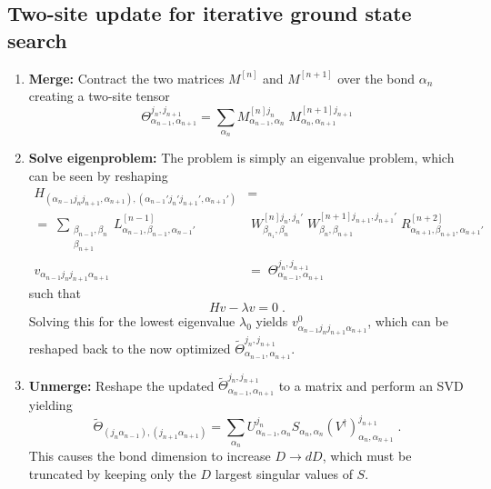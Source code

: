 \subsection{Two-site update for iterative ground state search}
\begin{enumerate}
\item
\textbf{Merge:} Contract the two matrices $M^{[n]}$ and $M^{[n+1]}$ over the bond $\alpha_{n}$ creating a two-site tensor
\begin{equation}
\Theta_{\alpha_{n-1} , \alpha_{n+1}}^{j_n , j_{n+1}} = \sum_{\alpha_n} M_{\alpha_{n-1} , \alpha_{n}}^{[n] j_n } \;  M_{\alpha_{n} , \alpha_{n+1}}^{[n+1] j_{n+1} } 
\end{equation}

\item
\textbf{Solve eigenproblem:} The problem is simply an eigenvalue problem, which can be seen by reshaping
\begin{align}
	H_{( \alpha_{n-1}  j_n  j_{n+1}, \alpha_{n+1}),(\alpha_{n-1}'  j_n '  j_{n+1}', \alpha_{n+1}')} &= \nonumber \\
	= \; \sum_{\substack{\beta_{n-1} , \beta_n \\ \beta_{n+1}}} L_{\alpha_{n-1}, \beta_{n-1} , \alpha_{n-1} '}^{[n-1]} & \; W_{\beta_{n_1}, \beta_n}^{[n] j_n , j_n '} \; W_{\beta_{n}, \beta_{n+1}}^{[n+1] j_{n+1} , j_{n+1} '}\;  R_{\alpha_{n+1} ,\beta_{n+1} , \alpha_{n+1} '}^{[n+2]} \\
	v_{ \alpha_{n-1} j_n j_{n+1} \alpha_{n+1}} &= \; \Theta_{\alpha_{n-1} , \alpha_{n+1}}^{j_n , j_{n+1}}
\end{align}
such that
\begin{equation}
	H v - \lambda v = 0 \; .
	\label{eq:eigprob}
\end{equation}
Solving this for the lowest eigenvalue $\lambda_0$ yields $v_{ \alpha_{n-1} j_n j_{n+1} \alpha_{n+1}}^0$, which can be reshaped back to the now optimized $\tilde{\Theta}_{\alpha_{n-1} , \alpha_{n+1}}^{j_n , j_{n+1}}$.

\item
\textbf{Unmerge:} Reshape the updated $\tilde{\Theta}_{\alpha_{n-1} , \alpha_{n+1}}^{j_n , j_{n+1}}$ to a matrix and perform an SVD yielding
\begin{equation}
	\tilde{\Theta}_{(j_n \alpha_{n-1} ) ,(j_{n+1}  \alpha_{n+1} )} = \sum_{\alpha_n} U_{\alpha_{n-1} , \alpha_{n}}^{j_n} S_{\alpha_n , \alpha_n} (V^{\dag})_{\alpha_{n} , \alpha_{n+1}}^{j_{n+1}} \; .
\end{equation}
This causes the bond dimension to increase $D \rightarrow d D$, which must be truncated by keeping only the $D$ largest singular values of $S$. 


\end{enumerate}
